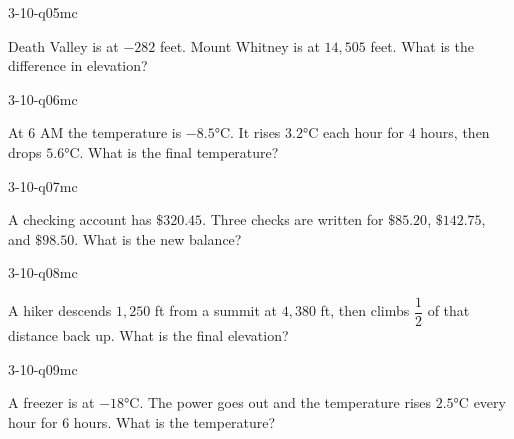 \begin{practiceQuestion}{3-10-q05}{mc}
\begin{questionText}
Death Valley is at $-282$ feet. Mount Whitney is at $14{,}505$ feet. What is the difference in elevation?
\end{questionText}
\end{practiceQuestion}

\begin{practiceQuestion}{3-10-q06}{mc}
\begin{questionText}
At $6$ AM the temperature is $-8.5°$C. It rises $3.2°$C each hour for $4$ hours, then drops $5.6°$C. What is the final temperature?
\end{questionText}
\end{practiceQuestion}

\begin{practiceQuestion}{3-10-q07}{mc}
\begin{questionText}
A checking account has $\$320.45$. Three checks are written for $\$85.20$, $\$142.75$, and $\$98.50$. What is the new balance?
\end{questionText}
\end{practiceQuestion}

\begin{practiceQuestion}{3-10-q08}{mc}
\begin{questionText}
A hiker descends $1{,}250$ ft from a summit at $4{,}380$ ft, then climbs $\dfrac{1}{2}$ of that distance back up. What is the final elevation?
\end{questionText}
\end{practiceQuestion}

\begin{practiceQuestion}{3-10-q09}{mc}
\begin{questionText}
A freezer is at $-18°$C. The power goes out and the temperature rises $2.5°$C every hour for $6$ hours. What is the temperature?
\end{questionText}
\end{practiceQuestion}

